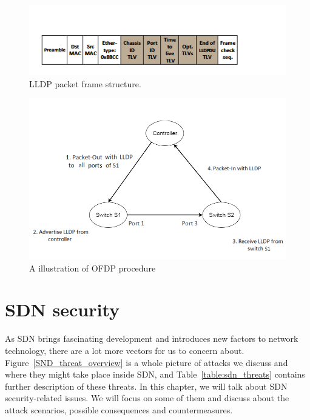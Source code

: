 \begin{figure}[H]
\begin{center} 
\includegraphics[width=1\textwidth]{figures/LLDP_packet_format.png}
\end{center}
\caption{LLDP packet frame structure. \cite{LLDP_WS}}
\label{LLDP_frame}
\end{figure}

\begin{figure}[H]
\begin{center} 
\includegraphics[width=1\textwidth]{figures/OFDP_procedure.png}
\end{center}
\caption{A illustration of OFDP procedure}
\label{OFDP}
\end{figure}

\section{SDN security}
\label{SDN security}
As SDN brings fascinating development and introduces new factors to network technology, there are a lot more vectors for us to concern about. Figure~\ref{SND_threat_overview} is a whole picture of attacks we discuss and where they might take place inside SDN, and Table~\ref{table:sdn_threats} contains further description of these threats. In this chapter, we will talk about SDN security-related issues. We will focus on some of them and discuss about the attack scenarios, possible consequences and countermeasures. 

